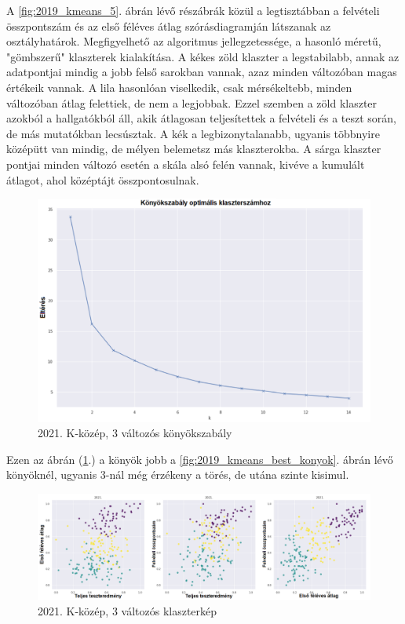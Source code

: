 \documentclass[12pt]{article}
\begin{document}
A \ref{fig:2019_kmeans_5}. ábrán lévő részábrák közül a legtisztábban a felvételi összpontszám és az első féléves átlag szórásdiagramján látszanak az osztályhatárok. Megfigyelhető az algoritmus jellegzetessége, a hasonló méretű, "gömbszerű" klaszterek kialakítása. A kékes zöld klaszter a legstabilabb, annak az adatpontjai mindig a jobb felső sarokban vannak, azaz minden változóban magas értékeik vannak. A lila hasonlóan viselkedik, csak mérsékeltebb, minden változóban átlag felettiek, de nem a legjobbak. Ezzel szemben a zöld klaszter azokból a hallgatókból áll, akik átlagosan teljesítettek a felvételi és a teszt során, de más mutatókban lecsúsztak. A kék a legbizonytalanabb, ugyanis többnyire középütt van mindig, de mélyen belemetsz más klaszterokba. A sárga klaszter pontjai minden változó esetén a skála alsó felén vannak, kivéve a kumulált átlagot, ahol középtájt összpontosulnak.

\begin{figure}[H]
\centering
\includegraphics[scale = 0.6]{kepek/2021_kmeans_konyok.png}
\caption{2021. K-közép, 3 változós könyökszabály}
\label{fig:2021_kmeans_konyok}
\end{figure}

Ezen az ábrán (\ref{fig:2021_kmeans_konyok}.) a könyök jobb a \ref{fig:2019_kmeans_best_konyok}. ábrán lévő könyöknél, ugyanis 3-nál még érzékeny a törés, de utána szinte kisimul.

\begin{figure}[H]
\centering
\includegraphics[width = \textwidth]{kepek/2021klacter.png}
\caption{2021. K-közép, 3 változós klaszterkép}
\label{fig:2021klacter}
\end{figure}
\end{document}
